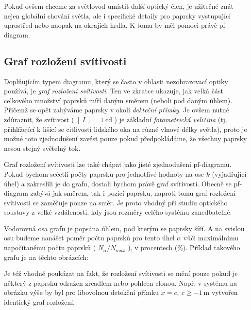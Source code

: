 Pokud ovšem chceme za světlovod umístit další optický člen, je užitečné znát nejen globální chování světla, ale i specifické detaily pro paprsky vystupující uprostřed nebo naopak na okrajích hrdla. K tomu by měl pomoci právě pf-diagram.


\subsection{Graf rozložení svítivosti}

Doplňujícím typem diagramu, který se často v oblasti nezobrazovací optiky používá, je \emph{graf rozložení svítivosti}. Ten ve zkratce ukazuje, jak velká část celkového množství paprsků míří daným směrem (neboli pod daným úhlem). Přičemž se opět zabýváme paprsky v okolí \emph{dekteční přímky}. Je ovšem nutné zdůraznit, že svítivost ( $[\ I\ ] = 1\ \mathrm{cd}$ ) je základní \emph{fotometrická veličina} (tj. přihlížející k lišící se citlivosti lidského oka na různé vlnové délky světla), proto je možné toto zjednodušení zavést pouze pokud předpokládáme, že všechny paprsky nesou stejný světelný tok.

Graf rozložení svítivosti lze také chápat jako jisté zjednodušení pf-diagramu. Pokud bychom sečetli počty paprsků pro jednotlivé hodnoty na ose $k$ (vyjadřující úhel) a zakreslili je do grafu, dostali bychom právě graf svítivosti. Obecně se pf-diagram zabývá jak směrem, tak i pozicí paprsku, naproti tomu graf rozložení svítivosti se zaměřuje pouze na směr. Je proto vhodný při studiu optického soustavy z velké vzdálenosti, kdy jsou rozměry celého systému zanedbatelné.

Vodorovná osa grafu je popsána úhlem, pod kterým se paprsky šíří. A na svislou osu budeme nanášet poměr počtu paprsků pro tento úhel $\alpha$ vůči maximálnímu napočítanému počtu paprsků ( $ N_\alpha / N_{max} $ ), v procentech ($\mathrm{\%}$). Příklad takového grafu je na těchto obrázcích:


Je též vhodné poukázat na fakt, že rozložení svítivosti se mění pouze pokud je některý z paprsků odražen zrcadlem nebo pohlcen clonou. Např. v systému na obrázku výše by byl pro libovolnou detekční přímku $x = c,\ c \geq -1\ \mathrm{m}$ vytvořen identický graf rozložení.